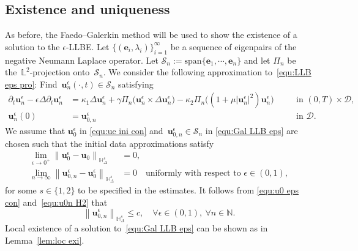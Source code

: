 \documentclass[11pt,reqno]{amsart}
\theoremstyle{definition}
\numberwithin{equation}{section}
\newcommand{\bff}{\boldsymbol}
\newcommand{\bb}{\mathbb}
\newcommand{\pa}{\partial}
\newcommand{\norm}[2]{\left\|{#1}\right\|_{#2}}
\begin{document}

\subsection{Existence and uniqueness}

As before, the Faedo--Galerkin method will be used to show the existence of a solution to the $\epsilon$-LLBE.
Let $\{(\bff{e}_i,\lambda_i)\}_{i=1}^{\infty}$ be a sequence of eigenpairs of the negative Neumann Laplace operator.
Let $\mathcal{S}_n:=\text{span}\{\bff{e}_1,\cdots,\bff{e}_n\}$ and let
$\Pi_n$ be the~$\bb{L}^2$-projection onto~$\mathcal{S}_n$. We consider the following
approximation to~\eqref{equ:LLB eps pro}: Find~$\bff{u}_n^\epsilon(\cdot,t)\in\mathcal{S}_n$
satisfying
\begin{equation}\label{equ:Gal LLB eps}
\begin{alignedat}{2}
 \pa_t\bff{u}^\epsilon_n
-\epsilon \Delta\pa_t\bff{u}^\epsilon_n
&=
\kappa_1\Delta\bff{u}^\epsilon_n
+
\gamma\Pi_n\bigl(\bff{u}^\epsilon_n\times\Delta\bff{u}^\epsilon_n\bigr)
-
\kappa_2\Pi_n\bigl((1+\mu|\bff{u}^\epsilon_n|^2)\bff{u}^\epsilon_n\bigr)
&\quad &\text{in } (0,T) \times \mathscr{D},
\\
\bff{u}_n^\epsilon(0) &= \bff{u}_{0,n}^\epsilon
		&\quad &\text{in } \mathscr{D}.
\end{alignedat}
\end{equation}
We assume that $\bff{u}_0^\epsilon$ in \eqref{equ:ue ini con} and~$\bff{u}_{0,n}^\epsilon\in\mathcal{S}_n$ in \eqref{equ:Gal LLB eps} are chosen such that the initial data approximations satisfy
\begin{subequations}\label{equ:approx u0 s}
	\begin{align}
		\lim_{\epsilon\to 0^+}
		\norm{\bff{u}_0^\epsilon-\bff{u}_0}{\bb{H}^s_\Delta} &= 0,
		\label{equ:u0 eps con}
		\\
		\lim_{n\to\infty}
		\norm{\bff{u}_{0,n}^\epsilon-\bff{u}_0^\epsilon}{\bb{H}^s_\Delta} &= 0
		\quad\text{uniformly with respect to $\epsilon\in (0,1)$},
		\label{equ:u0n H2}
	\end{align}
\end{subequations} 
for some $s\in \{1,2\}$ to be specified in the estimates.
It follows from \eqref{equ:u0 eps con} and~\eqref{equ:u0n H2} that
\begin{equation}\label{equ:u0n eps con}
\norm{\bff{u}_{0,n}^\epsilon}{\bb{H}^s_\Delta} \le c, \quad\forall\epsilon\in(0,1), \ \forall n\in \bb{N}.
\end{equation}
Local existence of a solution to~\eqref{equ:Gal LLB eps} can be shown as in Lemma~\ref{lem:loc exi}.
\end{document}
